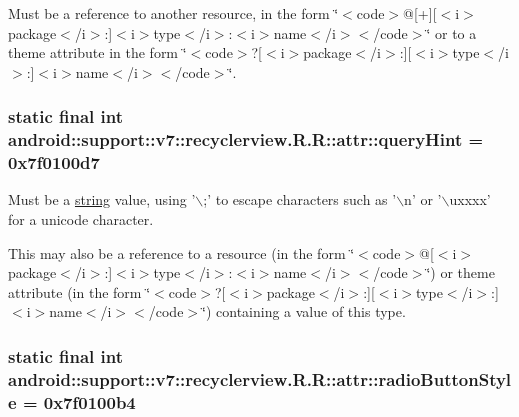 Must be a reference to another resource, in the form \char`\"{}$<$code$>$@\mbox{[}+\mbox{]}\mbox{[}$<$i$>$package$<$/i$>$:\mbox{]}$<$i$>$type$<$/i$>$:$<$i$>$name$<$/i$>$$<$/code$>$\char`\"{} or to a theme attribute in the form \char`\"{}$<$code$>$?\mbox{[}$<$i$>$package$<$/i$>$:\mbox{]}\mbox{[}$<$i$>$type$<$/i$>$:\mbox{]}$<$i$>$name$<$/i$>$$<$/code$>$\char`\"{}. \hypertarget{classandroid_1_1support_1_1v7_1_1recyclerview_1_1_r_1_1attr_ed84fca4814f2d037f093e9ff23fd58a}{
\subsubsection[{queryHint}]{\setlength{\rightskip}{0pt plus 5cm}static final int android::support::v7::recyclerview.R.R::attr::queryHint = 0x7f0100d7}}
\label{classandroid_1_1support_1_1v7_1_1recyclerview_1_1_r_1_1attr_ed84fca4814f2d037f093e9ff23fd58a}


Must be a \hyperlink{classandroid_1_1support_1_1v7_1_1recyclerview_1_1_r_1_1string}{string} value, using '$\backslash$;' to escape characters such as '$\backslash$n' or '$\backslash$uxxxx' for a unicode character. 

This may also be a reference to a resource (in the form \char`\"{}$<$code$>$@\mbox{[}$<$i$>$package$<$/i$>$:\mbox{]}$<$i$>$type$<$/i$>$:$<$i$>$name$<$/i$>$$<$/code$>$\char`\"{}) or theme attribute (in the form \char`\"{}$<$code$>$?\mbox{[}$<$i$>$package$<$/i$>$:\mbox{]}\mbox{[}$<$i$>$type$<$/i$>$:\mbox{]}$<$i$>$name$<$/i$>$$<$/code$>$\char`\"{}) containing a value of this type. \hypertarget{classandroid_1_1support_1_1v7_1_1recyclerview_1_1_r_1_1attr_0454e98e0727f2ed1cbf0b6982b219e7}{
\subsubsection[{radioButtonStyle}]{\setlength{\rightskip}{0pt plus 5cm}static final int android::support::v7::recyclerview.R.R::attr::radioButtonStyle = 0x7f0100b4}}
\label{classandroid_1_1support_1_1v7_1_1recyclerview_1_1_r_1_1attr_0454e98e0727f2ed1cbf0b6982b219e7}


